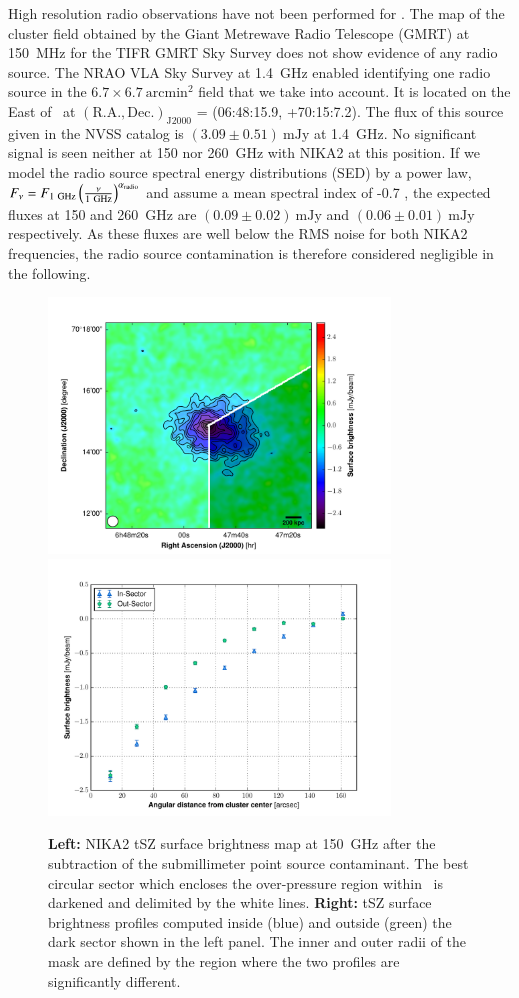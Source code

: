\documentclass[traditabstract]{aa}
\begin{document}
High resolution radio observations have not been performed for \psz. The map of the cluster field obtained by the Giant Metrewave Radio Telescope (GMRT) at 150~MHz for the TIFR GMRT Sky Survey \citep[TGSS,][]{int17} does not show evidence of any radio source. The NRAO VLA Sky Survey \citep[NVSS,][]{con98} at 1.4~GHz enabled identifying one radio source in the $6.7 \times 6.7~\mathrm{arcmin}^2$ field that we take into account. It is located on the East of \psz\ at $(\mathrm{R.A., Dec.})_{\mathrm{J2000}}$ = (06:48:15.9, +70:15:7.2). The flux of this source given in the NVSS catalog is $(3.09\pm 0.51)~\mathrm{mJy}$ at 1.4~GHz. No significant signal is seen neither at 150 nor 260~GHz with NIKA2 at this position. If we model the radio source spectral energy distributions (SED) by a power law, $F_{\nu} = F_{\rm{1~GHz}}\left(\frac{\nu}{\rm{1~GHz}}\right)^{\alpha_{\rm{radio}}}$ and assume a mean spectral index of -0.7 \citep{wit79,pla13}, the expected fluxes at 150 and 260~GHz are $(0.09\pm 0.02)~\mathrm{mJy}$ and $(0.06\pm 0.01)~\mathrm{mJy}$ respectively. As these fluxes are well below the RMS noise for both NIKA2 frequencies, the radio source contamination is therefore considered negligible in the following.
\begin{figure}[h!]
\centering
\includegraphics[height=6.8cm]{Paper_PSZ2G1441_2mm_nosource_sector.pdf}
\includegraphics[height=6.8cm]{SZ_profiles_mask.pdf}
\caption{{\footnotesize \textbf{Left:} NIKA2 tSZ surface brightness map at 150~GHz after the subtraction of the submillimeter point source contaminant. The best circular sector which encloses the over-pressure region within \psz\ is darkened and delimited by the white lines. \textbf{Right:} tSZ surface brightness profiles computed inside (blue) and outside (green) the dark sector shown in the left panel. The inner and outer radii of the mask are defined by the region where the two profiles are significantly different.}}
\label{fig:mask_defintion}
\end{figure}
\end{document}
